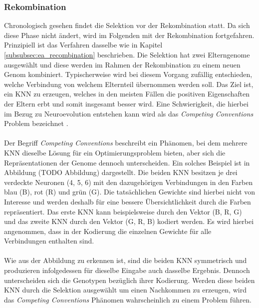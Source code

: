 \subsubsection{Rekombination}
\label{subsubsec}
Chronologisch gesehen findet die Selektion vor der Rekombination statt. Da sich diese Phase nicht ändert, wird im Folgenden mit der Rekombination fortgefahren. Prinzipiell ist das Verfahren dasselbe wie in Kapitel \ref{subsubsec:ea_recombination} beschrieben. Die Selektion hat zwei Elterngenome ausgewählt und diese werden im Rahmen der Rekombination zu einem neuen Genom kombiniert. Typischerweise wird bei diesem Vorgang zufällig entschieden, welche Verbindung von welchem Elternteil übernommen werden soll. Das Ziel ist, ein \ac{KNN} zu erzeugen, welches in den meisten Fällen die positiven Eigenschaften der Eltern erbt und somit insgesamt besser wird. Eine Schwierigkeit, die hierbei im Bezug zu Neuroevolution entstehen kann wird als das \emph{Competing Conventions} Problem bezeichnet \cite{stanley2002evolving}.
\\\\ %
Der Begriff \emph{Competing Conventions} beschreibt ein Phänomen, bei dem mehrere \ac{KNN} dieselbe Lösung für ein Optimierungsproblem bieten, aber sich die Repräsentationen der Genome dennoch unterscheiden. Ein solches Beispiel ist in Abbildung (TODO Abbildung) dargestellt. Die beiden \ac{KNN} besitzen je drei verdeckte Neuronen (4, 5, 6) mit den dazugehörigen Verbindungen in den Farben blau (B), rot (R) und grün (G). Die tatsächlichen Gewichte sind hierbei nicht von Interesse und werden deshalb für eine bessere Übersichtlichkeit durch die Farben repräsentiert. Das erste \ac{KNN} kann beispielsweise durch den Vektor (B, R, G) und das zweite \ac{KNN} durch den Vektor  (G, R, B) kodiert werden. Es wird hierbei angenommen, dass in der Kodierung die einzelnen Gewichte für alle Verbindungen enthalten sind. \\\\
Wie aus der Abbildung zu erkennen ist, sind die beiden \ac{KNN} symmetrisch und produzieren infolgedessen für dieselbe Eingabe auch dasselbe Ergebnis. Dennoch unterscheiden sich die Genotypen bezüglich ihrer Kodierung. Werden diese beiden \ac{KNN} durch die Selektion ausgewählt um einen Nachkommen zu erzeugen, wird das \emph{Competing Conventions} Phänomen wahrscheinlich zu einem Problem führen. \\\\

